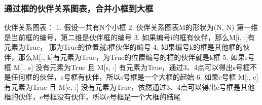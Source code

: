\documentclass[11pt]{article}
\begin{document}
    \hypertarget{ux901aux8fc7ux6846ux7684ux4f19ux4f34ux5173ux7cfbux56feux8868ux5408ux5e76ux5c0fux6846ux5230ux5927ux6846}{%
\subsubsection{通过框的伙伴关系图表，合并小框到大框}\label{ux901aux8fc7ux6846ux7684ux4f19ux4f34ux5173ux7cfbux56feux8868ux5408ux5e76ux5c0fux6846ux5230ux5927ux6846}}

    伙伴关系图表： 1. 假设一共有N个小框 2. 伙伴关系图表M的形状为(N, N)
第一维是当前框的编号，第二维是伙伴框的编号 3.
如果编号i的框有伙伴，那么M{[}i, :{]}有元素为True，
那为True的位置就i框伙伴的编号 4. 如果编号k的框是其他框的伙伴，那么M{[}:,
k{]}有元素为True，为True的位置编号的框的伙伴就是k框 5. 如果s号框 M{[}:,
s{]} 没有元素为True 且 M{[}s, :{]}
有元素为True，通过3、4点可以得出s号框不是任何框的伙伴，s号框有伙伴，所以s号框是一个大框的起始
6. 如果e号框 M{[}:, e{]} 有元素为True 且 M{[}e, :{]}
没有元素为True，依然通过3、4点可以得出e号框是其他框的伙伴，e号框没有伙伴，所以e号框是一个大框的结尾
\end{document}
